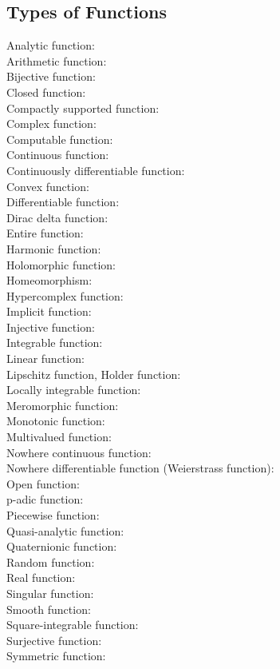 \documentclass[12pt]{article}
\begin{document}
\subsection{Types of Functions}
Analytic function:\\
Arithmetic function:\\
Bijective function:\\
Closed function:\\
Compactly supported function:\\
Complex function:\\
Computable function:\\
Continuous function:\\
Continuously differentiable function:\\
Convex function:\\
Differentiable function:\\
Dirac delta function:\\
Entire function:\\
Harmonic function:\\
Holomorphic function:\\
Homeomorphism:\\
Hypercomplex function:\\
Implicit function:\\
Injective function:\\
Integrable function:\\
Linear function:\\
Lipschitz function, Holder function:\\
Locally integrable function:\\
Meromorphic function:\\
Monotonic function:\\
Multivalued function:\\
Nowhere continuous function:\\
Nowhere differentiable function (Weierstrass function):\\
Open function:\\
p-adic function:\\
Piecewise function:\\
Quasi-analytic function:\\
Quaternionic function:\\
Random function:\\
Real function:\\
Singular function:\\
Smooth function:\\
Square-integrable function:\\
Surjective function:\\
Symmetric function:\\
\end{document}
